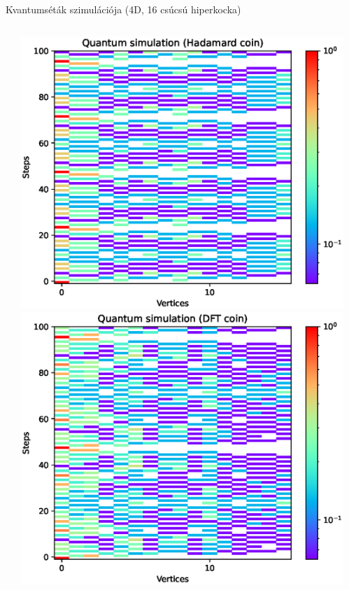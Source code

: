 \documentclass[aspectratio=169]{beamer}
\begin{document}
\begin{frame}{Kvantumséták szimulációja (4D, 16 csúcsú hiperkocka)}
\begin{columns}
\begin{column}{0.30\linewidth}
\begin{center}
\end{center}
\end{column}
\begin{column}{0.30\linewidth}
\begin{center}
\includegraphics[width=\linewidth]{./cikk_figures/results/hypercube/hadamard.eps}
\newline
\includegraphics[width=\linewidth]{./cikk_figures/results/hypercube/dft.eps}
\end{center}
\end{column}
\begin{column}{0.20\linewidth}
\end{column}
\end{columns}

\end{frame}
\end{document}
